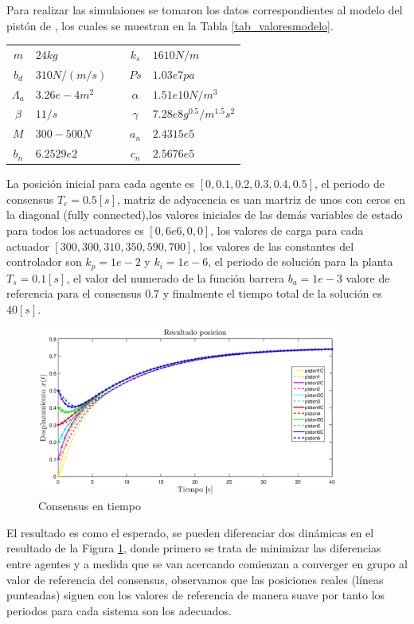 

Para realizar las simulaiones se tomaron los datos correspondientes al modelo del pistón de \cite{Electro-hydraulic_actuator}, los cuales se muestran en la Tabla \ref{tab_valoresmodelo}. 


\begin{center}
	\label{tab_valoresmodelo} 
	\begin{tabular}[t]{clccl}
		$m$ & $24kg$ & & $k_s$ & $1610 N/m$\\
		$b_d$ & $310N/(m/s)$ & & $Ps$ & $1.03e7 pa$\\
		$\Lambda_a$ & $3.26e-4 m^2$ & & $\alpha$ & $1.51e10 N/m^3$\\
		$\beta$ & $1 1/s$ & & $\gamma$ & $7.28e8 g^{0.5}/m^{1.5}s^2$\\
		$M$ & $300-500 N$ & & $a_n$ & $2.4315e5$\\
		$b_n$ & $6.2529e2$ & & $c_n$ & $2.5676e5$
	\end{tabular}
\end{center}

La posición inicial para cada agente es $[0,0.1,0.2,0.3,0.4,0.5]$, el periodo de consensus $T_c=0.5 [s]$, matriz de adyacencia es uan martriz de unos con ceros en la diagonal (fully connected),los valores iniciales de las demás variables de estado para todos los actuadores es $[0,6e6,0,0]$, los valores de carga para cada actuador $[300,300,310,350,590,700]$, los valores de las constantes del controlador son $k_p=1e-2$ y $k_i=1e-6$, el periodo de solución para la planta $T_s=0.1 [s]$, el valor del numerado de la función barrera $b_a=1e-3$ valore de referencia para el consensus $0.7$  y finalmente el tiempo total de la solución es $40 [s]$.


\begin{figure}[!h]
	\centering
	\includegraphics[width=3.9in]{imagenes/consensus_pos.eps}
	\caption{Consensus en tiempo}
	\label{fig_consensus_pos}
\end{figure}
El resultado es como el esperado, se pueden diferenciar dos dinámicas en el resultado de la Figura \ref{fig_consensus_pos}, donde  primero se trata de minimizar las diferencias entre agentes y a medida que se van acercando comienzan a converger en grupo al valor de referencia del consensus, observamos que las posiciones reales (líneas punteadas) siguen con los valores de referencia de manera suave por tanto los periodos para cada sistema son los adecuados.

